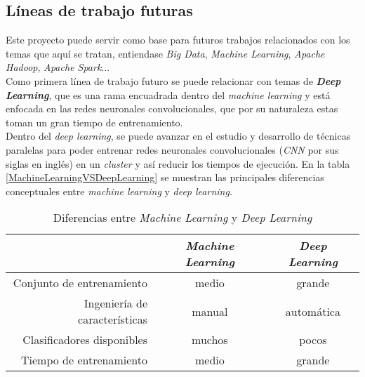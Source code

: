 \clearpage

\subsection*{Líneas de trabajo futuras}
Este proyecto puede servir como base para futuros trabajos relacionados con los temas que aquí se tratan, 
entiendase \textit{Big Data}, \textit{Machine Learning}, \textit{Apache Hadoop}, \textit{Apache Spark}...\\
Como primera línea de trabajo futuro se puede relacionar con temas de \textbf{\textit{Deep Learning}}, que es una rama encuadrada dentro del \textit{machine learning} 
y está enfocada en las redes neuronales convolucionales, que por su naturaleza estas toman un gran 
tiempo de entrenamiento.\\
Dentro del \textit{deep learning}, se puede avanzar en el estudio y desarrollo de técnicas paralelas para poder
entrenar redes neuronales convolucionales (\textit{CNN} por sus siglas en inglés) en un \textit{cluster} 
y así reducir los tiempos de ejecución.
En la tabla \autoref{MachineLearningVSDeepLearning} se muestran las principales diferencias conceptuales
entre \textit{machine learning} y \textit{deep learning}.

\begin{table}[!htpb]
  \centering
  \begin{tabular}{|r|c|c|} %
    \hline
    & \textbf{\textit{Machine Learning}} & \textbf{\textit{Deep Learning}} \\ \hline
    Conjunto de entrenamiento & medio & grande \\ \hline
    Ingeniería de características & manual & automática \\ \hline
    Clasificadores disponibles & muchos & pocos \\ \hline
    Tiempo de entrenamiento & medio & grande \\ \hline
  \end{tabular}
   \caption[Diferencias entre \textit{Machine Learning} y \textit{Deep Learning}]
           {Diferencias entre \textit{Machine Learning} y \textit{Deep Learning}}
   \label{MachineLearningVSDeepLearning}
\end{table}

